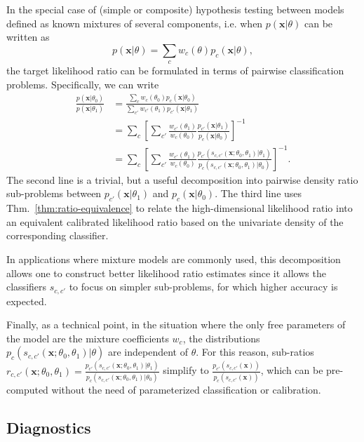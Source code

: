 \documentclass[12pt]{article}
\numberwithin{equation}{section}
\theoremstyle{plain}
\begin{document}
In the special case of (simple or composite) hypothesis testing between
models defined as known mixtures of several components, i.e. when $p(\mathbf{x}|\theta)$ can be written as
\begin{equation}
p(\mathbf{x}|\theta)=\sum_c w_c(\theta) p_c(\mathbf{x}| \theta),
\end{equation}
the target likelihood ratio can be formulated in terms of pairwise
classification problems. Specifically, we can write
\begin{align}
\frac{p(\mathbf{x}|\theta_0)}{p(\mathbf{x}|\theta_1)} &= \frac{\sum_c w_c(\theta_0) p_c(\mathbf{x}| \theta_0)}{\sum_{c'} w_{c'}(\theta_1) p_{c'}(\mathbf{x}| \theta_1)} \nonumber \\
&= \sum_c \left[ \sum_{c'} \frac{ w_{c'}(\theta_1)}{w_c(\theta_0)} \frac{ p_{c'}(\mathbf{x}| \theta_1)}{  p_c(\mathbf{x}| \theta_0)}  \right]^{-1} \nonumber \\
&= \sum_c \left[ \sum_{c'} \frac{ w_{c'}(\theta_1)}{w_c(\theta_0)} \frac{ p_{c'}(s_{c,c'}(\mathbf{x};\theta_0, \theta_1)| \theta_1)}{ p_c(s_{c,c'}(\mathbf{x};\theta_0, \theta_1)| \theta_0)}  \right]^{-1}. \label{eq:decomposedResult}
\end{align}
The second line is a trivial, but a useful decomposition into pairwise
density ratio sub-problems between $p_{c'}(\mathbf{x}|\theta_1)$ and
$p_c(\mathbf{x}|\theta_0)$.  The third line uses
Thm.~\ref{thm:ratio-equivalence} to relate the high-dimensional likelihood
ratio into an equivalent calibrated likelihood ratio based on the univariate
density of the corresponding classifier.

In applications where mixture models are commonly used, this decomposition allows
one to construct better likelihood ratio estimates since it allows the classifiers
$s_{c,c'}$ to focus on simpler sub-problems, for which higher accuracy is
expected.

Finally, as a technical point, in the situation where the only free parameters
of the  model are the mixture coefficients $w_c$, the distributions
$p_{c}(s_{c,c'}(\mathbf{x};\theta_0, \theta_1)| \theta)$ are independent of
$\theta$. For this reason, sub-ratios $r_{c, c'}(\mathbf{x}; \theta_0, \theta_1) = \frac{
p_{c'}(s_{c,c'}(\mathbf{x};\theta_0, \theta_1)|\theta_1)}{
p_c(s_{c,c'}(\mathbf{x};\theta_0, \theta_1)|\theta_0)}$ simplify to $\frac{
p_{c'}(s_{c,c'}(\mathbf{x}))}{ p_c(s_{c,c'}(\mathbf{x}))}$, which can be
pre-computed without the need of parameterized classification or
calibration.

\subsection{Diagnostics}\label{S:diagnostics}
\end{document}
